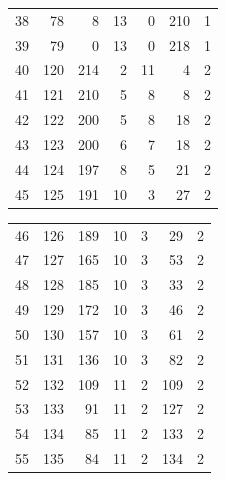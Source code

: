 \documentclass[a4paper,twoside,12pt]{book}
\begin{document}
\begin{appendices}
\begin{table}
\begin{tabular}{lrrrrrr}
		38  &     78 &         8 &        13 &               0 &             210 &         1 \\
		39  &     79 &         0 &        13 &               0 &             218 &         1 \\
		40  &    120 &       214 &         2 &              11 &               4 &         2 \\
		41  &    121 &       210 &         5 &               8 &               8 &         2 \\
		42  &    122 &       200 &         5 &               8 &              18 &         2 \\
		43  &    123 &       200 &         6 &               7 &              18 &         2 \\
		44  &    124 &       197 &         8 &               5 &              21 &         2 \\
		45  &    125 &       191 &        10 &               3 &              27 &         2 \\
		\bottomrule
	\end{tabular}		
\end{table}
\begin{table}
	\centering
	\begin{tabular}{lrrrrrr}
		\toprule
		46  &    126 &       189 &        10 &               3 &              29 &         2 \\
		47  &    127 &       165 &        10 &               3 &              53 &         2 \\
		48  &    128 &       185 &        10 &               3 &              33 &         2 \\
		49  &    129 &       172 &        10 &               3 &              46 &         2 \\
		50  &    130 &       157 &        10 &               3 &              61 &         2 \\
		51  &    131 &       136 &        10 &               3 &              82 &         2 \\
		52  &    132 &       109 &        11 &               2 &             109 &         2 \\
		53  &    133 &        91 &        11 &               2 &             127 &         2 \\
		54  &    134 &        85 &        11 &               2 &             133 &         2 \\
		55  &    135 &        84 &        11 &               2 &             134 &         2 \\

\end{tabular}
\end{table}
\end{appendices}
\end{document}
